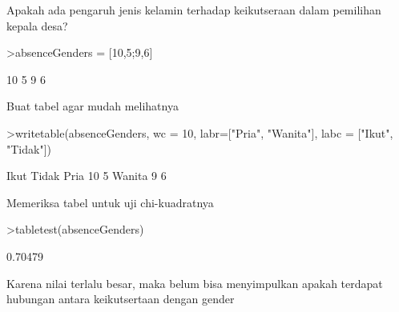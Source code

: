 \documentclass[a4paper,10pt]{article}
\begin{document}
\begin{eulernotebook}
\begin{eulercomment}
\begin{eulercomment}
\begin{eulercomment}
\begin{eulercomment}
\begin{eulercomment}
\begin{eulercomment}
\begin{eulercomment}
Apakah ada pengaruh jenis kelamin terhadap keikutseraan dalam
pemilihan kepala desa?
\end{eulercomment}
\begin{eulerprompt}
>absenceGenders = [10,5;9,6]
\end{eulerprompt}
\begin{euleroutput}
         10         5 
          9         6 
\end{euleroutput}
\begin{eulercomment}
Buat tabel agar mudah melihatnya
\end{eulercomment}
\begin{eulerprompt}
>writetable(absenceGenders, wc = 10, labr=["Pria", "Wanita"], labc = ["Ikut", "Tidak"])
\end{eulerprompt}
\begin{euleroutput}
                  Ikut     Tidak
        Pria        10         5
      Wanita         9         6
\end{euleroutput}
\begin{eulercomment}
Memeriksa tabel untuk uji chi-kuadratnya
\end{eulercomment}
\begin{eulerprompt}
>tabletest(absenceGenders)
\end{eulerprompt}
\begin{euleroutput}
  0.70479
\end{euleroutput}
\begin{eulercomment}
Karena nilai terlalu besar, maka belum bisa menyimpulkan apakah
terdapat hubungan antara keikutsertaan dengan gender


\end{eulercomment}
\end{eulercomment}
\end{eulercomment}
\end{eulercomment}
\end{eulercomment}
\end{eulercomment}
\end{eulercomment}
\end{eulernotebook}
\end{document}
